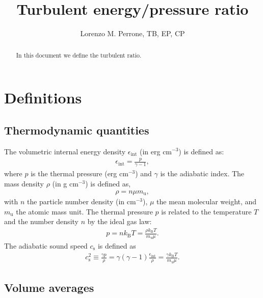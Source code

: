 \documentclass[]{article}
\title{Turbulent energy/pressure ratio}
\author{Lorenzo M. Perrone, TB, EP, CP}
\begin{document}
\maketitle

\begin{abstract}
In this document we define the turbulent ratio.
\end{abstract}


\section{Definitions}

\subsection{Thermodynamic quantities}

The volumetric internal energy density $\epsilon_{\mathrm{int}}$ (in erg cm$^{-3}$) is defined as:
%
\begin{align}
	\epsilon_{\mathrm{int}} = \frac{p}{\gamma - 1},
\end{align}
%
where $p$ is the thermal pressure (erg cm$^{-3}$) and $\gamma$ is the adiabatic index. The mass density $\rho$ (in g cm$^{-3}$) is defined as,
%
\begin{align}
	\rho = n \mu m_\mathrm{u} ,
\end{align}
%
with $n$ the particle number density (in cm$^{-3}$), $\mu$ the mean molecular weight, and $m_\mathrm{u}$ the atomic mass unit. The thermal pressure $p$ is related to the temperature $T$ and the number density $n$ by the ideal gas law:
%
\begin{align}
	p = n k_\mathrm{B} T = \frac{\rho k_{\mathrm{B}}T}{m_\mathrm{u} \mu}.
\end{align}
%
%
The adiabatic sound speed $c_{\mathrm{s}}$ is defined as
%
\begin{align}\label{eq:sound_speed}
	c_{\mathrm{s}}^2 \equiv \frac{\gamma p}{\rho} = \gamma (\gamma - 1) \frac{\epsilon_{\mathrm{int}}}{\rho} = \frac{\gamma k_{\mathrm{B}}T}{m_\mathrm{u} \mu}.
\end{align}
%

\subsection{Volume averages}
\end{document}
